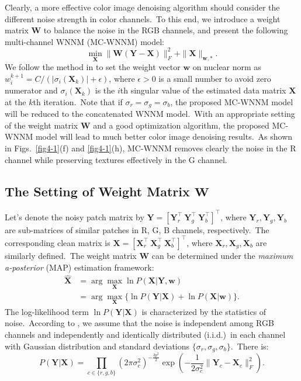 Clearly, a more effective color image denoising algorithm should consider the different noise strength in color channels.\ To this end, we introduce a weight matrix $\mathbf{W}$ to balance the noise in the RGB channels, and present the following multi-channel WNNM (MC-WNNM) model:
\begin{equation}
\label{equ4-4}
\min_{\mathbf{X}}\|\mathbf{W}(\mathbf{Y}-\mathbf{X})\|_{F}^{2}
+ 
\|\mathbf{X}\|_{\bm{w},*}.
\end{equation}
We follow the method in \cite{wnnmijcv} to set the weight vector $\bm{w}$ on nuclear norm as $w_{i}^{k+1}=C/(|\sigma_{i}(\mathbf{X}_{k})|+\epsilon)$, where $\epsilon>0$ is a small number to avoid zero numerator and $\sigma_{i}(\mathbf{X}_{k})$ is the $i$th singular value of the estimated data matrix $\mathbf{X}$ at the $k$th iteration.\ Note that if $\sigma_{r}=\sigma_{g}=\sigma_{b}$, the proposed MC-WNNM model will be reduced to the concatenated WNNM model.\ With an appropriate setting of the weight matrix $\mathbf{W}$ and a good optimization algorithm, the proposed MC-WNNM model will lead to much better color image denoising results.\ As shown in Figs.\ \ref{fig4-1}(f) and \ref{fig4-1}(h), MC-WNNM removes clearly the noise in the R channel while preserving textures effectively in the G channel. 


\subsection{The Setting of Weight Matrix $\mathbf{W}$}


Let's denote the noisy patch matrix by $\mathbf{Y}=[\mathbf{Y}_{r}^{\top}\ \mathbf{Y}_{g}^{\top}\ \mathbf{Y}_{b}^{\top}]^{\top}$, where $\mathbf{Y}_{r}, \mathbf{Y}_{g}, \mathbf{Y}_{b}$ are sub-matrices of similar patches in R, G, B channels, respectively.\ The corresponding clean matrix is $\mathbf{X}=[\mathbf{X}_{r}^{\top}\ \mathbf{X}_{g}^{\top}\ \mathbf{X}_{b}^{\top}]^{\top}$, where $\mathbf{X}_{r}, \mathbf{X}_{g}, \mathbf{X}_{b}$ are similarly defined.\ The weight matrix $\mathbf{W}$ can be determined under the \emph{maximum a-posterior} (MAP) estimation framework:
\begin{equation}
\label{equ4-5}
\begin{split}
\hat{\mathbf{X}} 
&=
\arg\max_{\mathbf{X}}\ln P(\mathbf{X}|\mathbf{Y},\bm{w})
\\
&
=
\arg\max_{\mathbf{X}}\{\ln P(\mathbf{Y}|\mathbf{X})+\ln P(\mathbf{X}|\bm{w})\}.
\end{split}
\end{equation}
The log-likelihood term $\ln P(\mathbf{Y}|\mathbf{X})$ is characterized by the
statistics of noise.\ According to \cite{Leungtip}, we assume that the noise is independent among RGB channels and independently and identically distributed (i.i.d.)\ in each channel with Gaussian distribution and standard deviations $\{\sigma_{r}, \sigma_{g}, \sigma_{b}\}$.\ There is:
\begin{equation}
\label{equ4-6}
P(\mathbf{Y}|\mathbf{X})
= 
\prod_{c\in\{r, g, b\}}
(2\pi\sigma_{c}^{2})^{-\frac{3p^{2}}{2}}
\exp(-\frac{1}{2\sigma_{c}^{2}}\|\mathbf{Y}_{c}-\mathbf{X}_{c}\|_{F}^{2}).
\end{equation}

